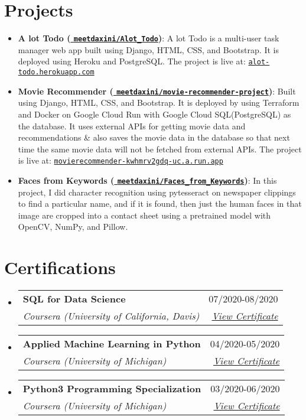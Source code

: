 \documentclass[9pt,letterpaper]{article}
\makeatletter
\newcommand{\resumeItem}[2]{
  \item\small{
    \textbf{#1}{: #2 \vspace{-2pt}}
  }
}
\newcommand{\resumeSubheading}[4]{
  \vspace{-1pt}\item
    \begin{tabular*}{0.97\textwidth}{l@{\extracolsep{\fill}}r}
      \textbf{#1} & #2 \\
      \textit{\small#3} & \textit{\small #4} \\
    \end{tabular*}\vspace{-5pt}
}
\newcommand{\resumeSubItem}[2]{\resumeItem{#1}{#2}\vspace{-4pt}}
\newcommand{\resumeSubHeadingListStart}{\begin{itemize}[leftmargin=*]}
\newcommand{\resumeSubHeadingListEnd}{\end{itemize}}
\makeatother
\begin{document}
\section{Projects}
  \resumeSubHeadingListStart
    
    \resumeSubItem{A lot Todo (\href{http://github.com/meetdaxini/Alot_Todo}{\faGithub  \hspace{0.05cm} \texttt{meetdaxini/Alot\_Todo}})}
      {A lot Todo is a multi-user task manager web app built using Django, HTML, CSS, and Bootstrap. It is deployed using Heroku and PostgreSQL. The project is live at: \href{http://alot-todo.herokuapp.com}{\faLink \hspace{0.05cm} \texttt{alot-todo.herokuapp.com}}}
      
    \resumeSubItem{Movie Recommender (\href{http://github.com/meetdaxini/movie-recommender-project}{\faGithub  \hspace{0.05cm}
      \texttt{meetdaxini/movie-recommender-project}})}
      {Built using Django, HTML, CSS, and Bootstrap. It is deployed by using Terraform and Docker on Google Cloud Run with Google Cloud SQL(PostgreSQL) as the database. It uses external APIs for getting movie data and recommendations \& also saves the movie data in the database so that next time the same movie data will not be fetched from external APIs. The project is live at: \href{https://movierecommender-kwhmrv2gdq-uc.a.run.app/}{\faLink \hspace{0.05cm}
    \texttt {movierecommender-kwhmrv2gdq-uc.a.run.app}}} 

    \resumeSubItem{Faces from Keywords (\href{https://github.com/meetdaxini/Faces_from_Keywords}{\faGithub  \hspace{0.05cm}
      \texttt{meetdaxini/Faces\_from\_Keywords}})}
      {In this project, I did character recognition using pytesseract on newspaper clippings to find a particular name, and if it is found, then just the human faces in that image are cropped into a contact sheet using a pretrained model with OpenCV, NumPy, and Pillow.}
    
  \resumeSubHeadingListEnd


\section{Certifications}
  \resumeSubHeadingListStart
    \resumeSubheading
    {SQL for Data Science} {07/2020-08/2020}
    {Coursera (University of California, Davis)}
    {\href{https://www.coursera.org/account/accomplishments/certificate/UQQXUZCP8HRC}{\faExternalLink  View Certificate}}
    \resumeSubheading
    {Applied Machine Learning in Python}{04/2020-05/2020}
    {Coursera (University of Michigan)}
    {\href{https://www.coursera.org/account/accomplishments/certificate/ZV83MCNV8ALE}{\faExternalLink  View Certificate}}
    \resumeSubheading
    {Python3 Programming Specialization}{03/2020-06/2020}
    {Coursera (University of Michigan)}
    {\href{http://www.coursera.org/account/accomplishments/certificate/C2XVUU6PXKBY}{\faExternalLink  View Certificate}}
  \resumeSubHeadingListEnd

\end{document}
